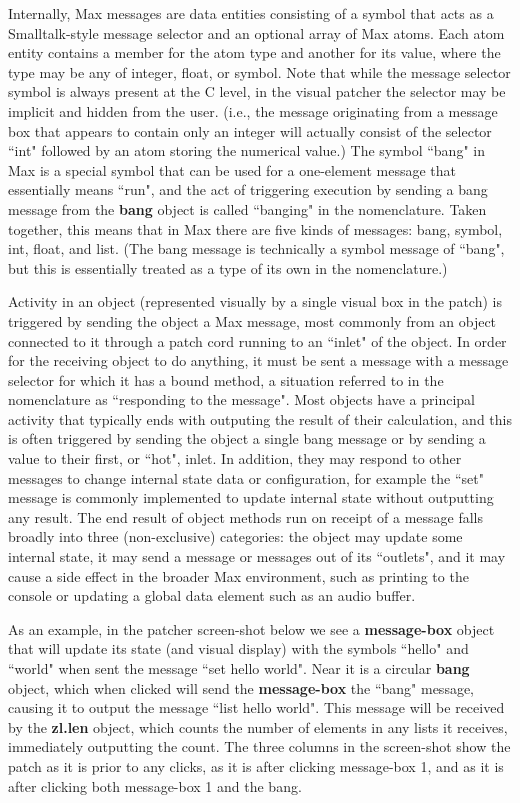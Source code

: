 \documentclass[acmsmall]{acmart}
\begin{document}
Internally, Max messages are data entities consisting of a symbol that acts
as a Smalltalk-style message selector and an optional array of Max atoms. 
Each atom entity contains a member for the atom type and another for its value, 
where the type may be any of integer, float, or symbol. 
Note that while the message selector symbol is always present at the C level,
in the visual patcher the selector may be implicit and hidden from the user. 
(i.e., the message originating from a message box that appears to contain only an integer
will actually consist of the selector ``int" followed by an atom storing the numerical value.)
The symbol ``bang" in Max is a special symbol that can be used for a one-element message 
that essentially means ``run", and the act of triggering execution by sending a bang
message from the \textbf{bang} object is called ``banging" in the nomenclature.
Taken together, this means that in Max there are five kinds of messages: 
bang, symbol, int, float, and list. (The bang message is technically a symbol message
of ``bang", but this is essentially treated as a type of its own in the nomenclature.) 

Activity in an object (represented visually by a single visual box in the patch) is triggered
by sending the object a Max message, most commonly from an object connected to it
through a patch cord running to an ``inlet" of the object. 
In order for the receiving object to do anything, it must 
be sent a message with a message selector for which it has a bound method,
a situation referred to in the nomenclature as ``responding to the message". Most objects
have a principal activity that typically ends with outputing the result of their calculation, and this is
often triggered by sending the object a single bang message or by sending a value to 
their first, or ``hot", inlet. In addition, they may respond to other messages to change internal state
data or configuration, for example the ``set" message is commonly implemented to update internal
state without outputting any result. The end result of object methods run on receipt of a message falls broadly
into three (non-exclusive) categories: the object may update some internal state, it may send a
message or messages out of its ``outlets", and it may cause a side effect in the broader
Max environment, such as printing to the console or updating a global data element such as
an audio buffer.

As an example, in the patcher screen-shot below we see a \textbf{message-box} object that will update
its state (and visual display) with the symbols ``hello" and ``world" when sent the message 
``set hello world". Near it is a circular \textbf{bang} object, which when clicked will send the
\textbf{message-box} the ``bang" message, causing it to output the message ``list hello world".
This message will be received by the \textbf{zl.len} object, which counts the number of elements 
in any lists it receives, immediately outputting the count. The three columns in the screen-shot
show the patch as it is prior to any clicks, as it is after clicking message-box 1,
and as it is after clicking both message-box 1 and the bang.
\end{document}
